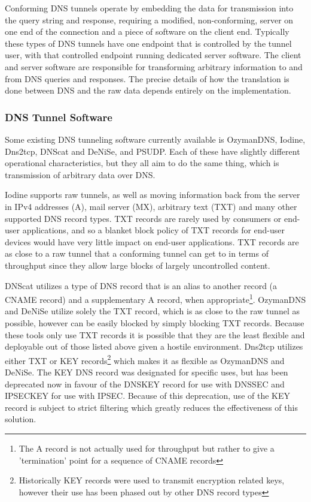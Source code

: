 \documentclass[12pt]{report}
\theoremstyle{remark}
\theoremstyle{definition}
\theoremstyle{definition}
\theoremstyle{definition}
\begin{document}
Conforming DNS tunnels operate by embedding the data for transmission into the
query string and response, requiring a modified, non-conforming, server on one
end of the connection and a piece of software on the client end. Typically these
types of DNS tunnels have one endpoint that is controlled by the tunnel user,
with that controlled endpoint running dedicated server software. The client and
server software are responsible for transforming arbitrary information to and
from DNS queries and responses. The precise details of how the translation is
done between DNS and the raw data depends entirely on the implementation.

\subsubsection{DNS Tunnel Software}
\label{tunnels-existing}
Some existing DNS tunneling software currently available is OzymanDNS\cite{ozymandnssrc},
Iodine\cite{iodinesrc}, Dns2tcp\cite{dns2tcpsrc}, DNScat\cite{dnscatsrc} and
DeNiSe\cite{denisesrc}, and PSUDP\cite{psudpsrc}. Each of these have slightly
different operational characteristics, but they all aim to do the same thing,
which is transmission of arbitrary data over DNS.

Iodine supports raw tunnels, as well as moving information back from the server
in IPv4 addresses (A), mail server (MX), arbitrary text (TXT) and many other
supported DNS record types. TXT records are rarely used by consumers or end-user
applications, and so a blanket block policy of TXT records for end-user devices
would have very little impact on end-user applications. TXT records are as close
to a raw tunnel that a conforming tunnel can get to in terms of throughput since
they allow large blocks of largely uncontrolled content.

DNScat utilizes a type of DNS record that is an alias to another record (a CNAME
record) and a supplementary A record, when appropriate\footnote{The A record is
not actually used for throughput but rather to give a 'termination' point for a
sequence of CNAME records}. OzymanDNS and DeNiSe utilize solely the TXT record,
which is as close to the raw tunnel as possible, however can be easily blocked
by simply blocking TXT records. Because these tools only use TXT records it is
possible that they are the least flexible and deployable out of those listed
above given a hostile environment. Dns2tcp utilizes either TXT or KEY
records\footnote{Historically KEY records were used to transmit encryption
related keys, however their use has been phased out by other DNS record types}
which makes it as flexible as OzymanDNS and DeNiSe. The KEY DNS record was
designated for specific uses\cite{rfc2931}, but has been deprecated
now\cite{rfc3445} in favour of the DNSKEY record for use with
DNSSEC\cite{rfc3755} and IPSECKEY for use with IPSEC\cite{rfc4025}. Because of
this deprecation, use of the KEY record is subject to strict filtering which
greatly reduces the effectiveness of this solution.
\end{document}

